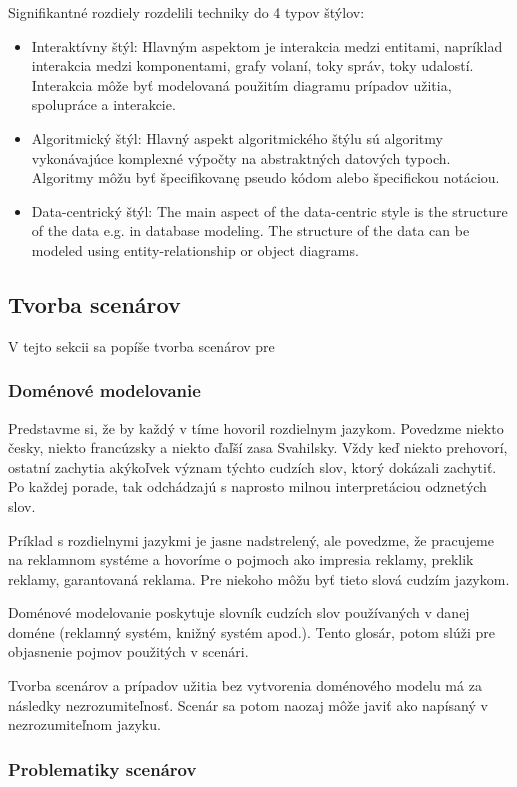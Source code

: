  Signifikantné rozdiely rozdelili techniky do 4 typov štýlov:

 
 \begin{itemize}
 	\item Interaktívny štýl: Hlavným aspektom je interakcia medzi entitami, napríklad interakcia medzi komponentami, grafy volaní, toky správ, toky udalostí. Interakcia môže byť modelovaná použitím diagramu prípadov užitia, spolupráce a interakcie.
 	\item Algoritmický štýl: Hlavný aspekt algoritmického štýlu sú algoritmy vykonávajúce komplexné výpočty na abstraktných datových typoch. Algoritmy môžu byť špecifikovanę pseudo kódom alebo špecifickou notáciou.
 	\item Data-centrický štýl: The main aspect of the data-centric style is the structure of the data e.g.
 	in database modeling. The structure of the data can be modeled using entity-relationship or
 	object diagrams.
 \end{itemize}

\subsection{Tvorba scenárov}
V tejto sekcii sa popíše tvorba scenárov pre 
\subsubsection{Doménové modelovanie}
Predstavme si, že by každý v tíme hovoril rozdielnym jazykom. Povedzme niekto česky, niekto francúzsky a niekto ďaľší zasa Svahilsky. Vždy keď niekto prehovorí, ostatní zachytia akýkoľvek význam týchto cudzích slov, ktorý dokázali zachytiť. Po každej porade, tak odchádzajú s naprosto milnou interpretáciou odznetých slov.

Príklad s rozdielnymi jazykmi je jasne nadstrelený, ale
povedzme, že pracujeme na reklamnom systéme a hovoríme o pojmoch ako impresia reklamy, preklik reklamy, garantovaná reklama. Pre niekoho môžu byť tieto slová cudzím jazykom.

Doménové modelovanie poskytuje slovník cudzích slov používaných v danej doméne (reklamný systém, knižný systém apod.). Tento glosár, potom slúži pre objasnenie pojmov použitých v scenári.

Tvorba scenárov a prípadov užitia bez vytvorenia doménového modelu má za následky nezrozumiteľnosť. Scenár sa potom naozaj môže javiť ako napísaný v nezrozumiteľnom jazyku.

\subsubsection{Problematiky scenárov}

